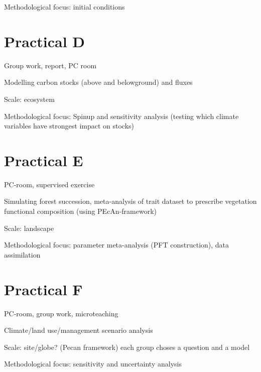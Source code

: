 \documentclass[
  12pt,
  oneside]{book}
\begin{document}
Methodological focus: initial conditions

\hypertarget{practical-d}{%
\chapter*{Practical D}\label{practical-d}}

Group work, report, PC room

Modelling carbon stocks (above and belowground) and fluxes

Scale: ecosystem

Methodological focus: Spinup and sensitivity analysis (testing which climate variables have strongest impact on stocks)

\hypertarget{practical-e}{%
\chapter*{Practical E}\label{practical-e}}

PC-room, supervised exercise

Simulating forest succession, meta-analysis of trait dataset to prescribe vegetation functional composition (using PEcAn-framework)

Scale: landscape

Methodological focus: parameter meta-analysis (PFT construction), data assimilation

\hypertarget{practical-f}{%
\chapter*{Practical F}\label{practical-f}}

PC-room, group work, microteaching

Climate/land use/management scenario analysis

Scale: site/globe? (Pecan framework) each group choses a question and a model

Methodological focus: sensitivity and uncertainty analysis

  
\end{document}
